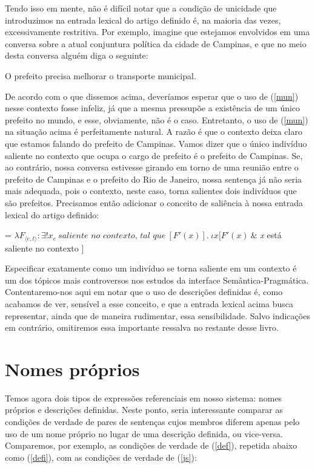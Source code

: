 Tendo isso em mente, não é difícil notar que a condição de
unicidade que introduzimos na entrada lexical do artigo definido
é, na maioria das vezes, excessivamente restritiva. Por exemplo,
imagine que estejamos envolvidos em uma conversa sobre a atual
conjuntura política da cidade de Campinas, e que no meio desta
conversa alguém diga o seguinte:

\begin{exe}
\ex O prefeito precisa melhorar o transporte municipal.\label{mun}
\end{exe}

\n De acordo com o que dissemos acima, deveríamos esperar que o
uso de (\ref{mun}) nesse contexto fosse infeliz, já que a mesma
pressupõe a existência de um único prefeito no mundo, e esse,
obviamente, não é o caso. Entretanto, o uso de (\ref{mun}) na
situação acima é perfeitamente natural. A razão é que o contexto
deixa claro que estamos falando do prefeito de Campinas. Vamos
dizer que o único indivíduo saliente no contexto que
ocupa o cargo de prefeito é o prefeito de Campinas. Se, ao
contrário, nossa conversa estivesse girando em torno de uma
reunião entre o prefeito de Campinas e o prefeito do Rio de
Janeiro, nossa sentença já não seria mais adequada, pois o
contexto, neste caso, torna salientes dois indivíduos que são
prefeitos. Precisamos então adicionar o conceito de saliência à
nossa entrada lexical do artigo definido:

\begin{exe}
	\ex {} = $\lambda F_{\langle e,t\rangle}:\exists !x_{e}\ \textit{saliente no contexto, tal que}\ [F'(x)].\ \iota x[F'(x)\ \& $ \textit{x} está saliente no contexto $]$
\end{exe}

\n Especificar exatamente como um indivíduo se torna saliente em
um contexto é um dos tópicos mais controversos nos estudos da
interface Se\-mân\-ti\-ca-Prag\-má\-ti\-ca.
Con\-ten\-ta\-re\-mo-\-nos aqui em notar que o uso de descrições
definidas é, como acabamos de ver, sensível a esse conceito, e que
a entrada lexical acima busca representar, ainda que de maneira
rudimentar, essa sensibilidade. Salvo indicações em contrário, omitiremos essa importante ressalva no restante desse livro.



\section{Nomes próprios}


Temos agora dois tipos de expressões referenciais em nosso
sistema: nomes próprios e descrições definidas. Neste ponto, seria
interessante comparar as condições de verdade de pares de
sentenças cujos membros diferem apenas pelo uso de um nome próprio
no lugar de uma descrição definida, ou vice-versa. Comparemos, por
exemplo, as condições de verdade de (\ref{def}), repetida abaixo
como (\ref{defi}), com as condições de verdade de (\ref{js}):

